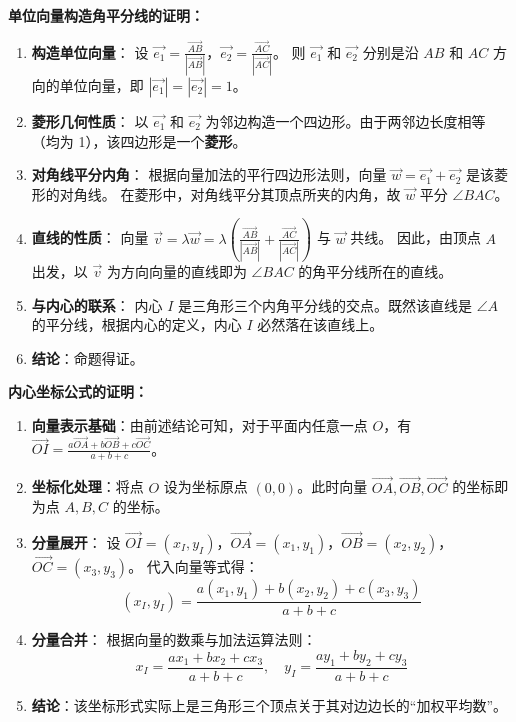 \begin{proofbox}
\textbf{单位向量构造角平分线的证明：}
\begin{enumerate}
    \item \textbf{构造单位向量}：
    设 $\vec{e_1} = \frac{\vec{AB}}{|\vec{AB}|}$，$\vec{e_2} = \frac{\vec{AC}}{|\vec{AC}|}$。
    则 $\vec{e_1}$ 和 $\vec{e_2}$ 分别是沿 $AB$ 和 $AC$ 方向的单位向量，即 $|\vec{e_1}| = |\vec{e_2}| = 1$。
    
    \item \textbf{菱形几何性质}：
    以 $\vec{e_1}$ 和 $\vec{e_2}$ 为邻边构造一个四边形。由于两邻边长度相等（均为 1），该四边形是一个\textbf{菱形}。
    
    \item \textbf{对角线平分内角}：
    根据向量加法的平行四边形法则，向量 $\vec{w} = \vec{e_1} + \vec{e_2}$ 是该菱形的对角线。
    在菱形中，对角线平分其顶点所夹的内角，故 $\vec{w}$ 平分 $\angle BAC$。
    
    \item \textbf{直线的性质}：
    向量 $\vec{v} = \lambda \vec{w} = \lambda \left( \frac{\vec{AB}}{|\vec{AB}|} + \frac{\vec{AC}}{|\vec{AC}|} \right)$ 与 $\vec{w}$ 共线。
    因此，由顶点 $A$ 出发，以 $\vec{v}$ 为方向向量的直线即为 $\angle BAC$ 的角平分线所在的直线。
    
    \item \textbf{与内心的联系}：
    内心 $I$ 是三角形三个内角平分线的交点。既然该直线是 $\angle A$ 的平分线，根据内心的定义，内心 $I$ 必然落在该直线上。
    
    \item \textbf{结论}：命题得证。
\end{enumerate}
\end{proofbox}

\begin{proofbox}
\textbf{内心坐标公式的证明：}
\begin{enumerate}
    \item \textbf{向量表示基础}：由前述结论可知，对于平面内任意一点 $O$，有 $\vec{OI} = \frac{a\vec{OA} + b\vec{OB} + c\vec{OC}}{a+b+c}$。
    \item \textbf{坐标化处理}：将点 $O$ 设为坐标原点 $(0,0)$。此时向量 $\vec{OA}, \vec{OB}, \vec{OC}$ 的坐标即为点 $A, B, C$ 的坐标。
    \item \textbf{分量展开}：
    设 $\vec{OI} = (x_I, y_I)$，$\vec{OA} = (x_1, y_1)$，$\vec{OB} = (x_2, y_2)$，$\vec{OC} = (x_3, y_3)$。
    代入向量等式得：
    \[ (x_I, y_I) = \frac{a(x_1, y_1) + b(x_2, y_2) + c(x_3, y_3)}{a+b+c} \]
    \item \textbf{分量合并}：
    根据向量的数乘与加法运算法则：
    \[ x_I = \frac{ax_1 + bx_2 + cx_3}{a+b+c}, \quad y_I = \frac{ay_1 + by_2 + cy_3}{a+b+c} \]
    \item \textbf{结论}：该坐标形式实际上是三角形三个顶点关于其对边边长的“加权平均数”。 
\end{enumerate}
\end{proofbox}